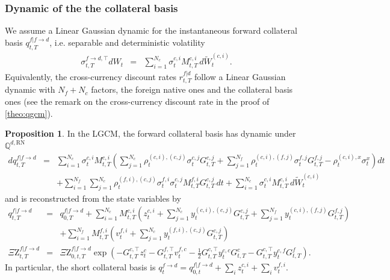 \documentclass[11pt,english]{amsart}
\newcommand{\RN}{\mathrm{RN}}
\newcommand{\QQ}{\mathbb{Q}}
\newcommand{\QZ}{{\Xi\mathrm{Z}}}
\theoremstyle{definition}
\newtheorem{prop}{Proposition}
\begin{document}
\subsubsection{Dynamic of the the collateral basis}%

We assume a Linear Gaussian dynamic for the instantaneous forward collateral basis $q^{f|f\to d}_{t,T}$, i.e. separable and deterministic volatility
\begin{eqnarray}
  \sigma^{f\to d,\top}_{t,T} dW_t &=& \sum_{i=1}^{N_c} \sigma^{c,i}_t M^{c,i}_{t,T}\, d\widetilde{W}^{(c,i)}_t .
\end{eqnarray}
Equivalently, the cross-currency discount rates $r^{f|d}_{t,T}$ follow a Linear Gaussian dynamic with $N_f + N_c$ factors, the foreign native ones and the collateral basis ones (see the remark on the cross-currency discount rate in the proof of \autoref{theo:qgcm}).

\begin{prop}
In the LGCM, the forward collateral basis has dynamic under $\QQ^{d,\RN}$
\begin{eqnarray}
  dq^{f|f\to d}_{t,T} &=& \sum_{i=1}^{N_c} \sigma^{c,i}_t M^{c,i}_{t,T}\left( \sum_{j=1}^{N_c} \rho^{(c,i),(c,j)}_t \sigma^{c,j}_t G^{c,j}_{t,T} + \sum_{j=1}^{N_f} \rho^{(c,i),(f,j)}_t \sigma^{f,j}_t G^{f,j}_{t,T} - \rho^{(c,i),x}_t\sigma^x_t \right) dt \nonumber \\
  & & + \sum_{i=1}^{N_f} \sum_{j=1}^{N_c} \rho^{(f,i),(c,j)}_t \sigma^{f,i}_t \sigma^{c,j}_t M^{f,i}_{t,T} G^{c,j}_{t,T}\, dt
  + \sum_{i=1}^{N_c} \sigma^{c,i}_t M^{c,i}_{t,T}\, d\widetilde{W}^{(c,i)}_t
\end{eqnarray}
and is reconstructed from the state variables by
\begin{eqnarray}
  q^{f|f\to d}_{t,T} &=& q^{f|f\to d}_{0,T} + \sum_{i=1}^{N_c} M^{c,i}_{t,T}\left( z^{c,i}_t + \sum_{j=1}^{N_c} y^{(c,i),(c,j)}_t G^{c,j}_{t,T} + \sum_{j=1}^{N_f} y^{(c,i),(f,j)}_t G^{f,j}_{t,T} \right) \nonumber \\
  & & + \sum_{i=1}^{N_f} M^{f,i}_{t,T}\left( v^{f,i}_t + \sum_{j=1}^{N_c} y^{(f,i),(c,j)}_t G^{c,j}_{t,T} \right) \\
  \QZ^{f|f\to d}_{t,T} &=& \QZ^{f|f\to d}_{0,t,T} \exp\left( -G^{c,\top}_{t,T} z^{c}_t - G^{f,\top}_{t,T} v^{f,c}_t - \frac{1}{2} G^{c,\top}_{t,T}  y^{c,c}_t G^{c}_{t,T} - G^{c,\top}_{t,T}  y^{c,f}_t G^{f}_{t,T}  \right) .
\end{eqnarray}
In particular, the short collateral basis is $q^{f\to d}_t = q^{f|f\to d}_{0,t} + \sum_i z^{c,i}_t + \sum_i v^{f,i}_t$.
\end{prop}
\end{document}
